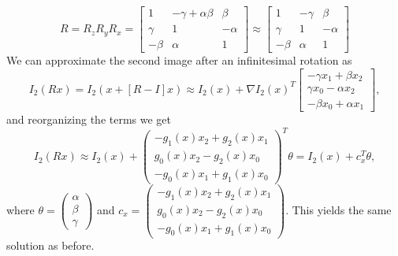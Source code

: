 \documentclass[11pt]{article}
\begin{document}
\begin{equation}
	R=R_{z}R_{y}R_{x}
	=\left[\begin{array}{ccc}1 & -\gamma + \alpha\beta & \beta\\ \gamma & 1 & -\alpha \\ -\beta & \alpha & 1\end{array}\right]
	\approx\left[\begin{array}{ccc}1 & -\gamma & \beta\\ \gamma & 1 & -\alpha \\ -\beta & \alpha & 1\end{array}\right]
\end{equation}
We can approximate the second image after an infinitesimal rotation as
\begin{equation}
	I_{2}(Rx) = I_{2}(x + \left[R-I\right]x)\approx I_{2}(x) + \nabla I_{2}(x)^{T}\left[ \begin{array}{c}
	-\gamma x_{1} + \beta x_{2}\\
	 \gamma x_{0} - \alpha x_{2}\\
	 -\beta x_{0} + \alpha x_{1}\end{array}\right],
\end{equation}
and reorganizing the terms we get
\begin{equation}
	I_{2}(Rx) \approx I_{2}(x) +
	\left( \begin{array}{c}
		   -g_{1}(x)x_{2} + g_{2}(x)x_{1}\\
			g_{0}(x)x_{2} - g_{2}(x)x_{0}\\
		   -g_{0}(x)x_{1} + g_{1}(x)x_{0}\end{array}\right)^{T} \theta = I_{2}(x)+c_{x}^{T}\theta,
\end{equation}
where $\theta = \left( \begin{array}{c}
		   \alpha\\
		   \beta\\
		   \gamma\end{array}\right)$ and $c_{x} = \left( \begin{array}{c}
		   -g_{1}(x)x_{2} + g_{2}(x)x_{1}\\
			g_{0}(x)x_{2} - g_{2}(x)x_{0}\\
		   -g_{0}(x)x_{1} + g_{1}(x)x_{0}\end{array}\right)$.
This yields the same solution as before.\\
\end{document}
